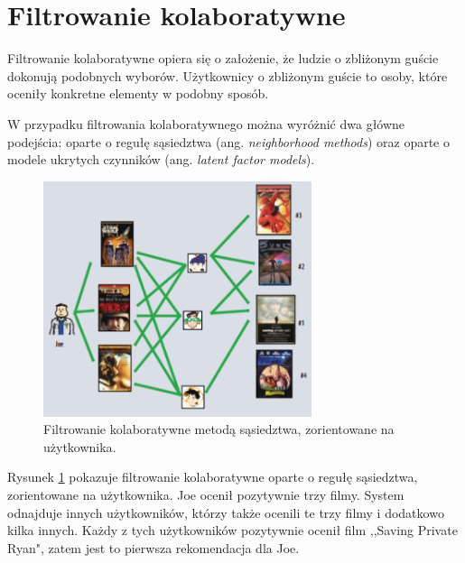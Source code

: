 \documentclass[twoside]{iisthesis}
\begin{document}
	 \section{Filtrowanie kolaboratywne}
	 
	 Filtrowanie kolaboratywne opiera się o założenie, że ludzie o zbliżonym guście dokonują podobnych wyborów. Użytkownicy o zbliżonym guście to osoby, które oceniły konkretne elementy w podobny sposób\cite{id:IntroductionToRecommenderSystemsHandbook}\cite{id:CollaborativeFilteringRecommenderSystems}\cite{id:huynh2012modeling}. 
	 
	 W przypadku filtrowania kolaboratywnego można wyróżnić dwa główne podejścia: oparte o regułę sąsiedztwa (ang. \textit{neighborhood methods}) oraz oparte o modele ukrytych czynników (ang. \textit{latent factor models})\cite{id:MatrixFactorizationTechniquesForRecommenderSystems}. 
	 
	 \begin{figure}[!ht] 
	 	\centering
	 	\includegraphics[width=0.7\textwidth]{cf}
	 	\caption{Filtrowanie kolaboratywne metodą sąsiedztwa,  zorientowane na użytkownika\protect\cite{id:MatrixFactorizationTechniquesForRecommenderSystems}.}
	 	\label{fig:cf}
	 \end{figure}
	 
	 Rysunek \ref{fig:cf} pokazuje filtrowanie kolaboratywne oparte o regułę sąsiedztwa, zorientowane na użytkownika. Joe ocenił pozytywnie trzy filmy. System odnajduje innych użytkowników, którzy także ocenili te trzy filmy i dodatkowo kilka innych. Każdy z tych użytkowników pozytywnie ocenił film ,,Saving Private Ryan", zatem jest to pierwsza rekomendacja dla Joe. 
	 
\end{document}
